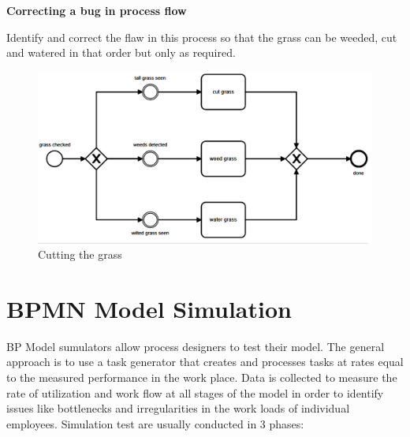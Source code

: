 \documentclass[]{book}
\let\BeginKnitrBlock\begin \let\EndKnitrBlock\end
\begin{document}
\BeginKnitrBlock{rmdexercise}
\textbf{Correcting a bug in process flow}

Identify and correct the flaw in this process so that
the grass can be weeded, cut and watered in that order but only as required.
\EndKnitrBlock{rmdexercise}

\begin{figure}
\centering
\includegraphics{images/cutgrass.png}
\caption{Cutting the grass}
\end{figure}

\hypertarget{bpmn-model-simulation}{%
\section{BPMN Model Simulation}\label{bpmn-model-simulation}}

BP Model sumulators allow process designers to test their model. The general approach is to use a task generator that creates and processes tasks at rates equal to the measured performance in the work place. Data is collected to measure the rate of utilization and work flow at all stages of the model in order to identify issues like bottlenecks and irregularities in the work loads of individual employees. Simulation test are usually conducted in 3 phases:
\end{document}
